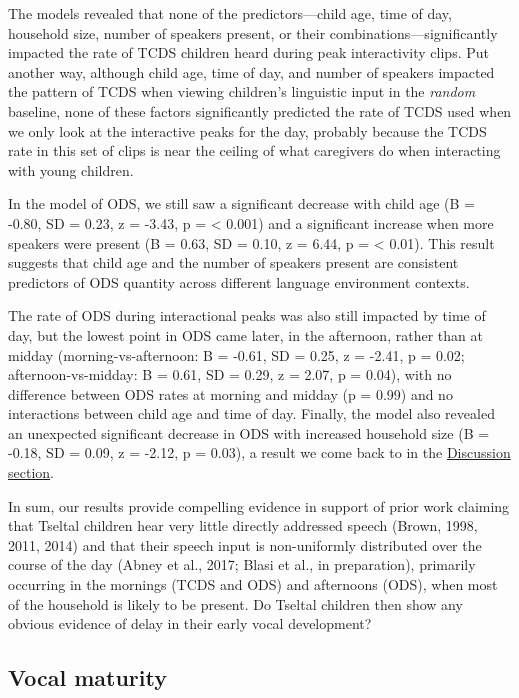\documentclass[floatsintext,man]{apa6}
\theoremstyle{definition}
\theoremstyle{definition}
\theoremstyle{definition}
\theoremstyle{remark}
\begin{document}
The models revealed that none of the predictors---child age, time of
day, household size, number of speakers present, or their
combinations---significantly impacted the rate of TCDS children heard
during peak interactivity clips. Put another way, although child age,
time of day, and number of speakers impacted the pattern of TCDS when
viewing children's linguistic input in the \emph{random} baseline, none
of these factors significantly predicted the rate of TCDS used when we
only look at the interactive peaks for the day, probably because the
TCDS rate in this set of clips is near the ceiling of what caregivers do
when interacting with young children.

In the model of ODS, we still saw a significant decrease with child age
(B = -0.80, SD = 0.23, z = -3.43, p = \textless{} 0.001) and a
significant increase when more speakers were present (B = 0.63, SD =
0.10, z = 6.44, p = \textless{} 0.01). This result suggests that child
age and the number of speakers present are consistent predictors of ODS
quantity across different language environment contexts.

The rate of ODS during interactional peaks was also still impacted by
time of day, but the lowest point in ODS came later, in the afternoon,
rather than at midday (morning-vs-afternoon: B = -0.61, SD = 0.25, z =
-2.41, p = 0.02; afternoon-vs-midday: B = 0.61, SD = 0.29, z = 2.07, p =
0.04), with no difference between ODS rates at morning and midday (p =
0.99) and no interactions between child age and time of day. Finally,
the model also revealed an unexpected significant decrease in ODS with
increased household size (B = -0.18, SD = 0.09, z = -2.12, p = 0.03), a
result we come back to in the \protect\hyperlink{disc}{Discussion
section}.

In sum, our results provide compelling evidence in support of prior work
claiming that Tseltal children hear very little directly addressed
speech (Brown, 1998, 2011, 2014) and that their speech input is
non-uniformly distributed over the course of the day (Abney et al.,
2017; Blasi et al., in preparation), primarily occurring in the mornings
(TCDS and ODS) and afternoons (ODS), when most of the household is
likely to be present. Do Tseltal children then show any obvious evidence
of delay in their early vocal development?

\subsection{Vocal maturity}\label{vocal-maturity}
\end{document}

